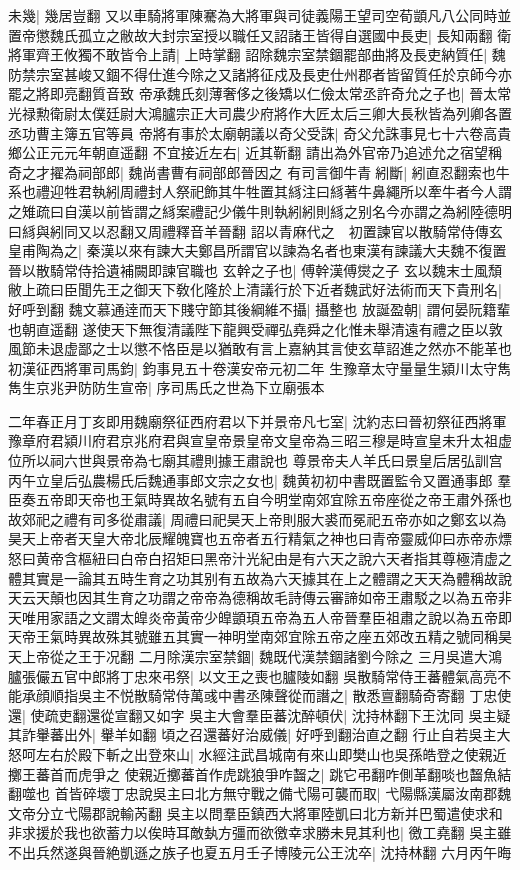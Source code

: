 未幾|{
	幾居豈翻}
又以車騎將軍陳騫為大將軍與司徒義陽王望司空荀顗凡八公同時並置帝懲魏氏孤立之敝故大封宗室授以職任又詔諸王皆得自選國中長吏|{
	長知兩翻}
衛將軍齊王攸獨不敢皆令上請|{
	上時掌翻}
詔除魏宗室禁錮罷部曲將及長吏納質任|{
	魏防禁宗室甚峻又錮不得仕進今除之又諸將征戍及長吏仕州郡者皆留質任於京師今亦罷之將即亮翻質音致}
帝承魏氏刻薄奢侈之後矯以仁儉太常丞許奇允之子也|{
	晉太常光禄勲衛尉太僕廷尉大鴻臚宗正大司農少府將作大匠太后三卿大長秋皆為列卿各置丞功曹主簿五官等員}
帝將有事於太廟朝議以奇父受誅|{
	奇父允誅事見七十六卷高貴鄉公正元元年朝直遥翻}
不宜接近左右|{
	近其靳翻}
請出為外官帝乃追述允之宿望稱奇之才擢為祠部郎|{
	魏尚書曹有祠部郎晉因之}
有司言御牛青紖斷|{
	紖直忍翻索也牛系也禮迎牲君執紖周禮封人祭祀飾其牛牲置其絼注曰絼著牛鼻繩所以牽牛者今人謂之雉疏曰自漢以前皆謂之絼案禮記少儀牛則執紖紖則絼之别名今亦謂之為紖陸德明曰絼與紖同又以忍翻又周禮釋音羊晉翻}
詔以青麻代之　初置諫官以散騎常侍傳玄皇甫陶為之|{
	秦漢以來有諫大夫鄭昌所謂官以諫為名者也東漢有諫議大夫魏不復置晉以散騎常侍拾遺補闕即諫官職也}
玄幹之子也|{
	傅幹漢傅爕之子}
玄以魏末士風頹敝上疏曰臣聞先王之御天下敎化隆於上清議行於下近者魏武好法術而天下貴刑名|{
	好呼到翻}
魏文慕通逹而天下賤守節其後綱維不攝|{
	攝整也}
放誕盈朝|{
	謂何晏阮籍輩也朝直遥翻}
遂使天下無復清議陛下龍興受禪弘堯舜之化惟未舉清遠有禮之臣以敦風節未退虚鄙之士以懲不恪臣是以猶敢有言上嘉納其言使玄草詔進之然亦不能革也　初漢征西將軍司馬鈞|{
	鈞事見五十卷漢安帝元初二年}
生豫章太守量量生潁川太守雋雋生京兆尹防防生宣帝|{
	序司馬氏之世為下立廟張本}


二年春正月丁亥即用魏廟祭征西府君以下并景帝凡七室|{
	沈約志曰晉初祭征西將軍豫章府君潁川府君京兆府君與宣皇帝景皇帝文皇帝為三昭三穆是時宣皇未升太祖虚位所以祠六世與景帝為七廟其禮則據王肅說也}
尊景帝夫人羊氏曰景皇后居弘訓宫　丙午立皇后弘農楊氏后魏通事郎文宗之女也|{
	魏黄初初中書既置監令又置通事郎}
羣臣奏五帝即天帝也王氣時異故名號有五自今明堂南郊宜除五帝座從之帝王肅外孫也故郊祀之禮有司多從肅議|{
	周禮曰祀昊天上帝則服大裘而冕祀五帝亦如之鄭玄以為昊天上帝者天皇大帝北辰耀魄寶也五帝者五行精氣之神也曰青帝靈威仰曰赤帝赤熛怒曰黄帝含樞紐曰白帝白招矩曰黑帝汁光紀由是有六天之說六天者指其尊極清虚之體其實是一論其五時生育之功其别有五故為六天據其在上之體謂之天天為體稱故說天云天顛也因其生育之功謂之帝帝為德稱故毛詩傳云審諦如帝王肅駁之以為五帝非天唯用家語之文謂太皥炎帝黃帝少皥顗頊五帝為五人帝晉羣臣祖肅之說以為五帝即天帝王氣時異故殊其號雖五其實一神明堂南郊宜除五帝之座五郊改五精之號同稱昊天上帝從之王于况翻}
二月除漢宗室禁錮|{
	魏既代漢禁錮諸劉今除之}
三月吳遣大鴻臚張儼五官中郎將丁忠來弔祭|{
	以文王之喪也臚陵如翻}
吳散騎常侍王蕃體氣高亮不能承顔順指吳主不悦散騎常侍萬彧中書丞陳聲從而譖之|{
	散悉亶翻騎奇寄翻}
丁忠使還|{
	使疏吏翻還從宣翻又如字}
吳主大會羣臣蕃沈醉頓伏|{
	沈持林翻下王沈同}
吳主疑其詐轝蕃出外|{
	轝羊如翻}
頃之召還蕃好治威儀|{
	好呼到翻治直之翻}
行止自若吳主大怒呵左右於殿下斬之出登來山|{
	水經注武昌城南有來山即樊山也吳孫皓登之使親近擲王蕃首而虎爭之}
使親近擲蕃首作虎跳狼爭咋齧之|{
	跳它弔翻咋側革翻啖也齧魚結翻噬也}
首皆碎壞丁忠說吳主曰北方無守戰之備弋陽可襲而取|{
	弋陽縣漢屬汝南郡魏文帝分立弋陽郡說輸芮翻}
吳主以問羣臣鎮西大將軍陸凱曰北方新并巴蜀遣使求和非求援於我也欲蓄力以俟時耳敵埶方彊而欲徼幸求勝未見其利也|{
	徼工堯翻}
吳主雖不出兵然遂與晉絶凱遜之族子也夏五月壬子博陵元公王沈卒|{
	沈持林翻}
六月丙午晦

